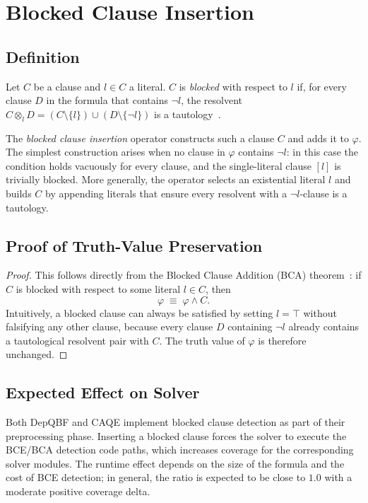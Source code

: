 \section{Blocked Clause Insertion}\label{sec:blocked}

\subsection{Definition}

Let $C$ be a clause and $l \in C$ a literal. $C$ is \emph{blocked} with respect to $l$ if, for every clause $D$ in the formula that contains $\lnot l$, the resolvent $C \otimes_l D = (C \setminus \{l\}) \cup (D \setminus \{\lnot l\})$ is a tautology~\cite{BiereEtAl2011}.

The \emph{blocked clause insertion} operator constructs such a clause $C$ and adds it to $\varphi$. The simplest construction arises when no clause in $\varphi$ contains $\lnot l$: in this case the condition holds vacuously for every clause, and the single-literal clause $[l]$ is trivially blocked. More generally, the operator selects an existential literal $l$ and builds $C$ by appending literals that ensure every resolvent with a $\lnot l$-clause is a tautology.
\subsection{Proof of Truth-Value Preservation}

\begin{proof}
This follows directly from the Blocked Clause Addition (BCA) theorem~\cite{Jarvisalo2010,BiereEtAl2011}: if $C$ is blocked with respect to some literal $l \in C$, then
\[
  \varphi \;\equiv\; \varphi \land C.
\]
Intuitively, a blocked clause can always be satisfied by setting $l = \top$ without falsifying any other clause, because every clause $D$ containing $\lnot l$ already contains a tautological resolvent pair with $C$. The truth value of $\varphi$ is therefore unchanged. 
\end{proof}

\subsection{Expected Effect on Solver}

Both DepQBF and CAQE implement blocked clause detection as part of their preprocessing phase. Inserting a blocked clause forces the solver to execute the BCE/BCA detection code paths, which increases coverage for the corresponding solver modules. The runtime effect depends on the size of the formula and the cost of BCE detection; in general, the ratio is expected to be close to $1.0$ with a moderate positive coverage delta.

